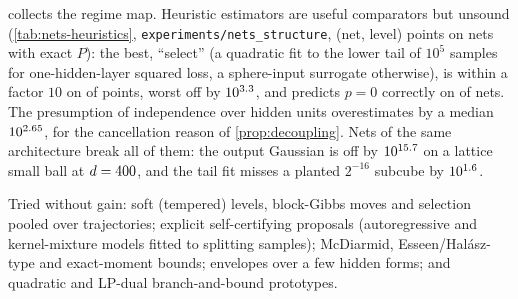  collects the regime map. Heuristic estimators are useful
comparators but unsound (\cref{tab:nets-heuristics}, \texttt{experiments/nets\_structure},
\nnHeurPoints{} (net, level) points on \nnHeurNets{} nets with exact $P$): the best,
``select'' (a quadratic fit to the lower tail of $10^5$ samples for one-hidden-layer
squared loss, a sphere-input surrogate otherwise), is within a factor $10$ on
\nnSelWithin{} of points, worst off by $10^{3.3}$, and predicts $p=0$ correctly
on \nnSelPzero{} of nets. The presumption of independence over hidden units
overestimates by a median $10^{2.65}$, for the cancellation reason of
\cref{prop:decoupling}. Nets of the same architecture break all of them: the output
Gaussian is off by $10^{15.7}$ on a lattice small ball at $d=400$, and
the tail fit misses a planted $2^{-16}$ subcube by $10^{1.6}$.

Tried without gain: soft (tempered) levels, block-Gibbs moves and selection pooled over
trajectories; explicit self-certifying proposals (autoregressive and kernel-mixture
models fitted to splitting samples); McDiarmid, Esseen/Halász-type and exact-moment
bounds; envelopes over a few hidden forms; and quadratic and LP-dual branch-and-bound
prototypes.

\begin{table}[htbp]
\centering\scriptsize\setlength{\tabcolsep}{4pt}

\caption{Regime map for the suite and the nets trained here. Costs as in
\cref{tab:nets-smc-suite,tab:nets-smc-scaling,tab:nets-exact}.}
\label{tab:nets-regimes}
\end{table}

\begin{table}[htbp]
\centering\scriptsize

\caption{Unsound heuristic estimators against exact $P$: median, median absolute and
worst $\log_{10}(\text{estimate}/P)$; ``$\times10$'': fraction of points within a factor
$10$ (all points, and those with $P\le10^{-6}$); and the fraction of nets on which
``$2^d\times$ estimate $<1$'' predicts $p=0$ correctly. Tail fit: a quadratic fit to the
log lower tail of $10^5$ samples, extrapolated; select: the tail fit for one hidden layer
and squared loss, the sphere surrogate otherwise; independence: hidden units treated as
independent (\texttt{nets\_structure/heuristics.py}).}
\label{tab:nets-heuristics}
\end{table}

